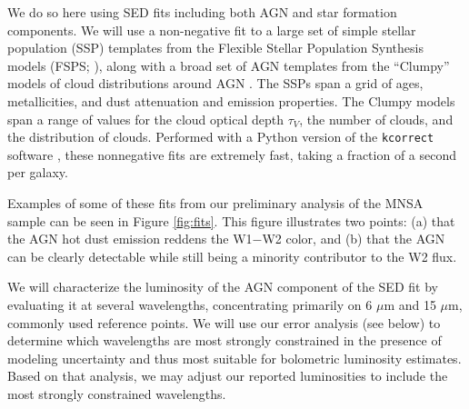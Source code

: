 \documentclass[12pt, preprint]{hacked-aastex}
\begin{document}

We do so here using SED fits including both AGN and star formation
components. We will use a non-negative fit to a large set of simple
stellar population (SSP) templates from the Flexible Stellar
Population Synthesis models (FSPS; \cite{conroy09a}), along with a
broad set of AGN templates from the ``Clumpy'' models of cloud
distributions around AGN \cite{nenkova08a}. The SSPs span a grid of
ages, metallicities, and dust attenuation and emission properties. The
Clumpy models span a range of values for the cloud optical depth
$\tau_V$, the number of clouds, and the distribution of
clouds. Performed with a Python version of the {\tt kcorrect} software
\cite{blanton06b}, these nonnegative fits are extremely fast, taking a
fraction of a second per galaxy.

Examples of some of these fits from our preliminary analysis of the
MNSA sample can be seen in Figure \ref{fig:fits}. This figure
illustrates two points: (a) that the AGN hot dust emission reddens the
W1$-$W2 color, and (b) that the AGN can be clearly detectable while
still being a minority contributor to the W2 flux.

We will characterize the luminosity of the AGN component of the SED
fit by evaluating it at several wavelengths, concentrating primarily
on 6 $\mu$m and 15 $\mu$m, commonly used reference points. We will use
our error analysis (see below) to determine which wavelengths are most
strongly constrained in the presence of modeling uncertainty and thus
most suitable for bolometric luminosity estimates. Based on that
analysis, we may adjust our reported luminosities to include the most
strongly constrained wavelengths.
\end{document}
